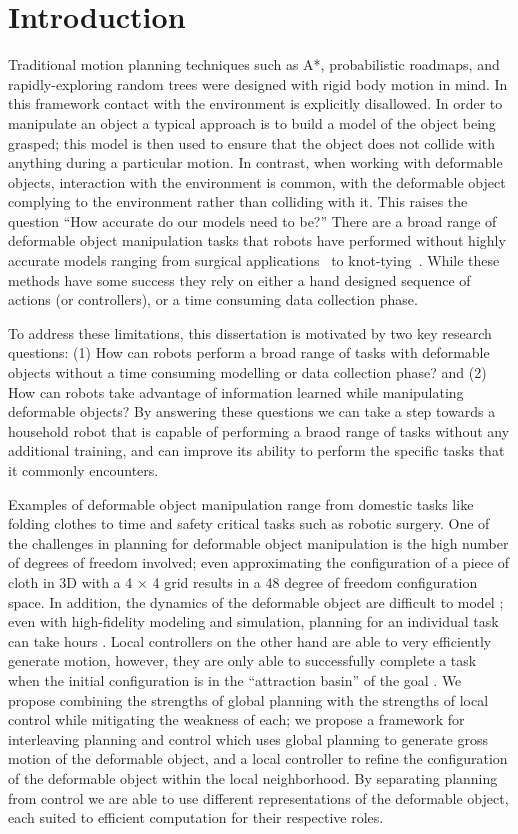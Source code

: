 \chapter{Introduction}


Traditional motion planning techniques such as A*, probabilistic roadmaps, and rapidly-exploring random trees were designed with rigid body motion in mind. In this framework contact with the environment is explicitly disallowed. In order to manipulate an object a typical approach is to build a model of the object being grasped; this model is then used to ensure that the object does not collide with anything during a particular motion. In contrast, when working with deformable objects, interaction with the environment is common, with the deformable object complying to the environment rather than colliding with it. This raises the question ``How accurate do our models need to be?'' There are a broad range of deformable object manipulation tasks that robots have performed without highly accurate models ranging from surgical applications~\cite{Wang2018} to knot-tying~\cite{Huang2015}. While these methods have some success they rely on either a hand designed sequence of actions (or controllers), or a time consuming data collection phase.

To address these limitations, this dissertation is motivated by two key research questions: (1) How can robots perform a broad range of tasks with deformable objects without a time consuming modelling or data collection phase? and (2) How can robots take advantage of information learned while manipulating deformable objects? By answering these questions we can take a step towards a household robot that is capable of performing a braod range of tasks without any additional training, and can improve its ability to perform the specific tasks that it commonly encounters.

Examples of deformable object manipulation range from domestic tasks like folding clothes to time and safety critical tasks such as robotic surgery. One of the challenges in planning for deformable object manipulation is the high number of degrees of freedom involved; even approximating the configuration of a piece of cloth in 3D with a 4 $\times$ 4 grid results in a 48 degree of freedom configuration space. In addition, the dynamics of the deformable object are difficult to model \citep{Essahbi2012}; even with high-fidelity modeling and simulation, planning for an individual task can take hours \citep{Bai2016}. Local controllers on the other hand are able to very efficiently generate motion, however, they are only able to successfully complete a task when the initial configuration is in the ``attraction basin'' of the goal \citep{Berenson2013,McConachie2018}. We propose combining the strengths of global planning with the strengths of local control while mitigating the weakness of each; we propose a framework for interleaving planning and control which uses global planning to generate gross motion of the deformable object, and a local controller to refine the configuration of the deformable object within the local neighborhood. By separating planning from control we are able to use different representations of the deformable object, each suited to efficient computation for their respective roles.

